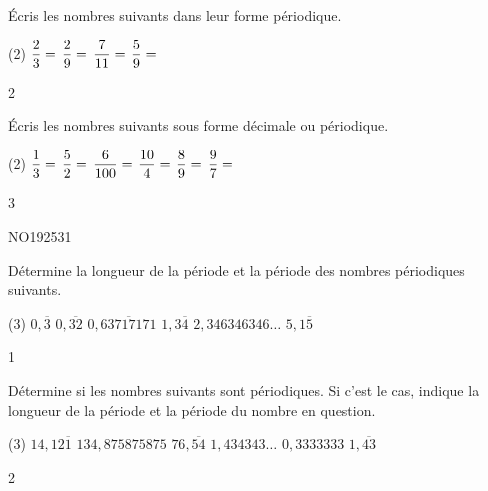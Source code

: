 \documentclass[a4paper,11pt]{report}
\begin{document}
\begin{exo}{
Écris les nombres suivants dans leur forme périodique.
\begin{tasks}(2)
    \task $\dfrac{2}{3}=\hrulefill$\hspace{0.5cm}
    \task $\dfrac{2}{9}=\hrulefill$
    \task $\dfrac{7}{11}=\hrulefill$\hspace{0.5cm}
    \task $\dfrac{5}{9}=\hrulefill$
\end{tasks}
 \vspace{1pt}

}{2}\end{exo}

\begin{exo}{
Écris les nombres suivants sous forme décimale ou périodique.
\begin{tasks}(2)
    \task $\dfrac{1}{3}=\hrulefill$\hspace{0.5cm}
    \task $\dfrac{5}{2}=\hrulefill$
    \task $\dfrac{6}{100}=\hrulefill$\hspace{0.5cm}
    \task $\dfrac{10}{4}=\hrulefill$
    \task $\dfrac{8}{9}=\hrulefill$\hspace{0.5cm}
    \task $\dfrac{9}{7}=\hrulefill$
\end{tasks}
 \vspace{1pt}

}{3}\end{exo}


\begin{exol}{NO192}{53}{1}
\end{exol}

\begin{exo}{
	Détermine la longueur de la période et la période des nombres périodiques suivants.
	\begin{tasks}[after-item-skip=0.2em, after-skip=-0.5em](3)
		\task $0,\overline{3}$
		\task $0,\overline{32}$
		\task $0,\overline{63717171}$
		\task $1,3\overline{4}$
		\task $2,346346346\ldots$
		\task $5,1\overline{5}$
	\end{tasks}
 \vspace{1pt}
}{1}\end{exo}

\begin{exo}{
	Détermine si les nombres suivants sont périodiques. Si c'est le cas, indique la longueur de la période et la période du nombre en question.
	\begin{tasks}[after-item-skip=0.2em, after-skip=-0.5em](3)
		\task $14,12\overline{1}$
		\task $134,875875875$
		\task $76,\overline{54}$
		\task $1,434343\ldots$
		\task $0,3333333$
		\task $1,\overline{43}$
	\end{tasks}
 \vspace{1pt}
}{2}\end{exo}
\end{document}

